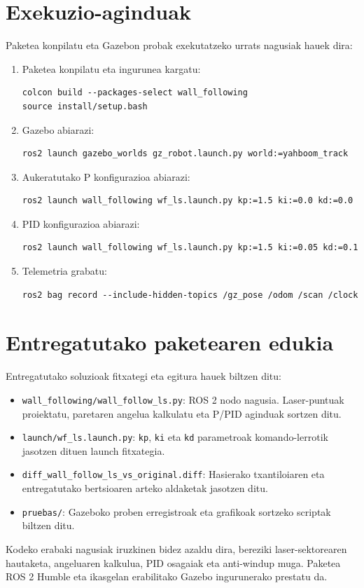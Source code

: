 \section{Exekuzio-aginduak}\label{sec:exekuzioa}
Paketea konpilatu eta Gazebon probak exekutatzeko urrats nagusiak hauek dira:

\begin{enumerate}[leftmargin=1.5em, itemsep=0.3em]
  \item Paketea konpilatu eta ingurunea kargatu:
\begin{verbatim}
colcon build --packages-select wall_following
source install/setup.bash
\end{verbatim}
  \item Gazebo abiarazi:
\begin{verbatim}
ros2 launch gazebo_worlds gz_robot.launch.py world:=yahboom_track
\end{verbatim}
  \item Aukeratutako P konfigurazioa abiarazi:
\begin{verbatim}
ros2 launch wall_following wf_ls.launch.py kp:=1.5 ki:=0.0 kd:=0.0
\end{verbatim}
  \item PID konfigurazioa abiarazi:
\begin{verbatim}
ros2 launch wall_following wf_ls.launch.py kp:=1.5 ki:=0.05 kd:=0.1
\end{verbatim}
  \item Telemetria grabatu:
\begin{verbatim}
ros2 bag record --include-hidden-topics /gz_pose /odom /scan /clock
\end{verbatim}
\end{enumerate}

\clearpage
\section{Entregatutako paketearen edukia}\label{sec:fitxategiak}
Entregatutako soluzioak fitxategi eta egitura hauek biltzen ditu:

\begin{itemize}[leftmargin=1.5em, itemsep=0.35em]
  \item \texttt{wall\_following/wall\_follow\_ls.py}: ROS 2 nodo nagusia. Laser-puntuak proiektatu, paretaren angelua kalkulatu eta P/PID aginduak sortzen ditu.
  \item \texttt{launch/wf\_ls.launch.py}: \texttt{kp}, \texttt{ki} eta \texttt{kd} parametroak komando-lerrotik jasotzen dituen launch fitxategia.
  \item \texttt{diff\_wall\_follow\_ls\_vs\_original.diff}: Hasierako txantiloiaren eta entregatutako bertsioaren arteko aldaketak jasotzen ditu.
  \item \texttt{pruebas/}: Gazeboko proben erregistroak eta grafikoak sortzeko scriptak biltzen ditu.
\end{itemize}

\vspace{0.8em}
\noindent Kodeko erabaki nagusiak iruzkinen bidez azaldu dira, bereziki laser-sektorearen hautaketa, angeluaren kalkulua, PID osagaiak eta anti-windup muga. Paketea ROS 2 Humble eta ikasgelan erabilitako Gazebo ingurunerako prestatu da.
